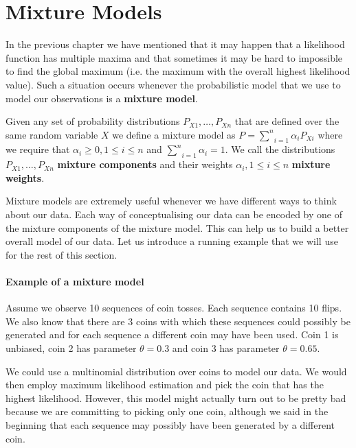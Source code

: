 \section{Mixture Models}

In the previous chapter we have mentioned that it may happen that a likelihood function has multiple 
maxima and that sometimes it may be hard to impossible to find the global maximum (i.e. the maximum
with the overall highest likelihood value). Such a situation occurs whenever the probabilistic model
that we use to model our observations is a \textbf{mixture model}.

\begin{Definition}\label{def:mixtureModel}
Given any set of probability distributions $ P_{X1}, \ldots, P_{Xn} $ that are defined over the same
random variable $ X $ we define a mixture model as
$ P = \underset{i=1}{\overset{n}{\sum}} \alpha_{i}P_{Xi} $
where we require that $ \alpha_{i} \geq 0, 1 \leq i \leq n $ and 
$ \underset{i=1}{\overset{n}{\sum}} \alpha_{i} = 1 $.
We call the distributions $ P_{X1}, \ldots, P_{Xn} $ \textbf{mixture components} and their weights
$ \alpha_{i}, 1 \leq i \leq n $ \textbf{mixture weights}.
\end{Definition}

Mixture models are extremely useful whenever we have different ways to think about our data. Each way
of conceptualising our data can be encoded by one of the mixture components of the mixture model.
This can help us to build a better overall model of our data. Let us introduce a running example that
we will use for the rest of this section. 

\paragraph{Example of a mixture model} Assume we observe 10 sequences of coin tosses. Each sequence
contains 10 flips. We also know that there are 3 coins with which these sequences could possibly be
generated and for each sequence a different coin may have been used. Coin 1 is unbiased, coin 2 has
parameter $ \theta = 0.3 $ and coin 3 has parameter $ \theta = 0.65 $. 
 
We could use 
a multinomial distribution over coins to model our data. We would then employ maximum likelihood estimation 
and pick the coin that has the highest likelihood. However, this model might actually turn out to be
pretty bad because we are committing to picking only one coin, although we said in the beginning that
each sequence may possibly have been generated by a different coin. 

